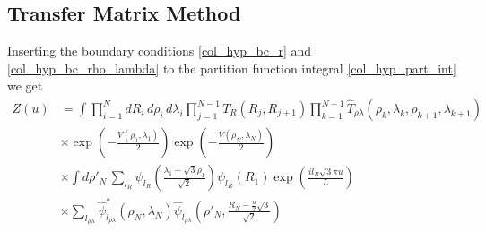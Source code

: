 \subsection{Transfer Matrix Method}
%
Inserting the boundary conditions \eqref{col_hyp_bc_r} and \eqref{col_hyp_bc_rho_lambda} to the partition function integral \eqref{col_hyp_part_int} we get
%
\begin{align}\label{col_hyp_part_1}
Z \left(u\right)&=\int\prod^{N}_{i=1}dR_i\,d\rho_i\,d\lambda_i\prod^{N-1}_{j=1}T_{R}(R_j,R_{j+1})\prod^{N-1}_{k=1}\hat{T}_{\rho\lambda}(\rho_k,\lambda_k,\rho_{k+1},\lambda_{k+1})\nonumber\\
&\times\exp\left(-\frac{V\left(\rho_{1},\lambda_{1}\right)}{2}\right)\exp\left(-\frac{V\left(\rho_{N},\lambda_{N}\right)}{2}\right)\nonumber\\
&\times\int d\rho'_N\,\sum_{l_R}\psi_{l_R}\left(\frac{\lambda_1 + \sqrt{3}\rho_1}{\sqrt{2}}\right)\psi_{l_R}\left(R_{1}\right)\exp\left(\frac{il_R\sqrt{3}\pi u}{L}\right)\nonumber\\ 
&\times\sum_{l_{\rho\lambda}}\hat{\psi}^{*}_{l_{\rho\lambda}}\left(\rho_{N},\lambda_{N}\right)\hat{\psi}_{l_{\rho\lambda}}\left(\rho'_{N},\frac{R_N-\frac{u}{2}\sqrt{3}}{\sqrt{2}}\right)
\end{align}

